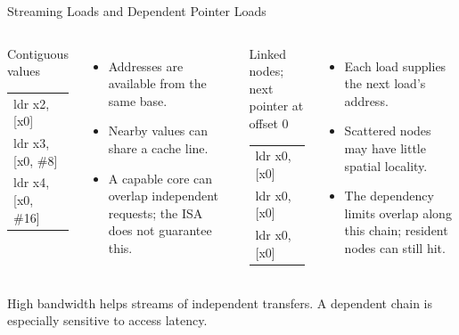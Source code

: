 \documentclass[aspectratio=169,11pt,t]{beamer}
\makeatletter
\newcommand{\Asm}[1]{{\ttfamily\small\begin{tabular}{@{}l@{}}#1\end{tabular}}}
\makeatother
\begin{document}
\begin{frame}{Streaming Loads and Dependent Pointer Loads}
\begin{columns}[T,onlytextwidth]
\begin{block}{Contiguous values}
\Asm{ldr x2, [x0]\\ldr x3, [x0, \#8]\\ldr x4, [x0, \#16]}
\end{block}
\small
\begin{itemize}\setlength{\itemsep}{5pt}
  \item Addresses are available from the same base.
  \item Nearby values can share a cache line.
  \item A capable core can overlap independent requests; the ISA does not guarantee this.
\end{itemize}
\begin{block}{Linked nodes; next pointer at offset 0}
\Asm{ldr x0, [x0]\\ldr x0, [x0]\\ldr x0, [x0]}
\end{block}
\small
\begin{itemize}\setlength{\itemsep}{5pt}
  \item Each load supplies the next load's address.
  \item Scattered nodes may have little spatial locality.
  \item The dependency limits overlap along this chain; resident nodes can still hit.
\end{itemize}
\end{columns}
\vspace{.22cm}
\small High bandwidth helps streams of independent transfers. A dependent chain is especially sensitive to access latency.
\end{frame}
\end{document}
